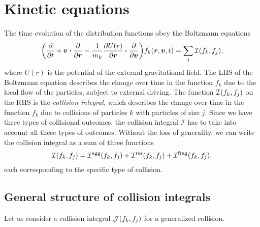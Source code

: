 \documentclass[aps,prl,preprint,groupedaddress,10pt]{revtex4-2}
\begin{document}
\section{Kinetic equations}
The time evolution of the distribution functions obey the Boltzmann equations
\begin{equation}
    \pqty{\pdv{t}+\bv\vdot\pdv{\br}-\frac{1}{m_k}\pdv{U(r)}{\br}\vdot\pdv{\bv}}
    f_k\pqty{\br,\bv,t}=\sum_{j}\mathcal{I}\pqty{f_k,f_j},
\end{equation}
where $U(r)$ is the potential of the external gravitational field. The LHS
of the Boltzmann equation describes the change over time in the function $f_k$ due to the
local flow of the particles, subject to external driving. The function 
$\mathcal{I}\pqty{f_k,f_j}$ on the RHS is the \emph{collision integral}, which 
describes the change over time in the function $f_k$ due to collisions of particles $k$
with particles of size $j$. Since we have three types of collisional outcomes, the 
collision integral $\mathcal{I}$ has to take into account all these types of outcomes.
Without the loss of generality, we can write the collision integral as a sum of three 
functions
\begin{equation}
    \mathcal{I}\pqty{f_k,f_j}=\utx{\mathcal{I}}{agg}\pqty{f_k,f_j}+
    \utx{\mathcal{I}}{res}\pqty{f_k,f_j}+\utx{\mathcal{I}}{frag}\pqty{f_k,f_j},
\end{equation}
each corresponding to the specific type of collision.

\subsection{General structure of collision integrals}
Let us consider a collision integral $\mathcal{J}\pqty{f_k,f_j}$ for a generalized 
collision.


    
\end{document}
